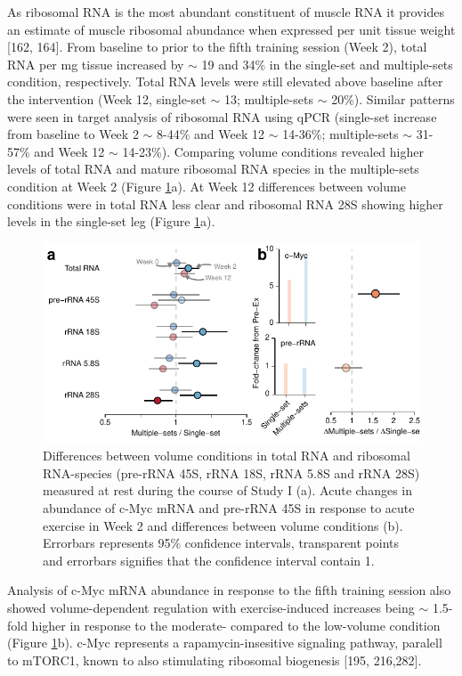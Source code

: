 \documentclass[twoside,10pt]{gihclass} %
\begin{document}
As ribosomal RNA is the most abundant constituent of muscle RNA it provides an estimate of muscle ribosomal abundance when expressed per unit tissue weight
{[}162, 164{]}.
From baseline to prior to the fifth training session (Week 2), total RNA per mg tissue increased by \(\sim\) 19 and 34\% in the single-set and multiple-sets condition, respectively. Total RNA levels were still elevated above baseline after the intervention (Week 12, single-set \(\sim\) 13; multiple-sets \(\sim\) 20\%). Similar patterns were seen in target analysis of ribosomal RNA using qPCR (single-set increase from baseline to Week 2 \(\sim\) 8-44\% and Week 12 \(\sim\) 14-36\%; multiple-sets \(\sim\) 31-57\% and Week 12 \(\sim\) 14-23\%). Comparing volume conditions revealed higher levels of total RNA and mature ribosomal RNA species in the multiple-sets condition at Week 2 (Figure \ref{fig:rrna-fig}a). At Week 12 differences between volume conditions were in total RNA less clear and ribosomal RNA 28S showing higher levels in the single-set leg (Figure \ref{fig:rrna-fig}a).
\begin{figure}

{\centering \includegraphics{thesis_files/figure-latex/rrna-fig-1} 

}

\caption[Differences between volume conditions total RNA and ribosomal RNA]{Differences between volume conditions in total RNA and ribosomal RNA-species (pre-rRNA 45S, rRNA 18S, rRNA 5.8S and rRNA 28S) measured at rest during the course of Study I (a). Acute changes in abundance of c-Myc mRNA and pre-rRNA 45S in response to acute exercise in Week 2 and differences between volume conditions (b). Errorbars represents 95\% confidence intervals, transparent points and errorbars signifies that the confidence interval contain 1.}\label{fig:rrna-fig}
\end{figure}
Analysis of c-Myc mRNA abundance in response to the fifth training session also showed volume-dependent regulation with exercise-induced increases being \(\sim\) 1.5-fold higher in response to the moderate- compared to the low-volume condition (Figure \ref{fig:rrna-fig}b). c-Myc represents a rapamycin-insesitive signaling pathway, paralell to mTORC1, known to also stimulating ribosomal biogenesis
{[}195, 216,282{]}.
\end{document}
